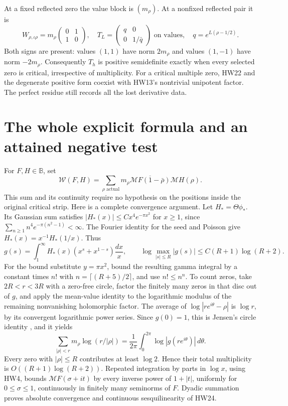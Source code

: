 \documentclass[11pt,a4paper]{article}
\theoremstyle{definition}\newtheorem{definition}[theorem]{Definition}
\newcommand{\B}{\mathbb B}\newcommand{\N}{\mathbb N}
\providecommand{\M}{\mathcal M}
\begin{document}
At a fixed reflected zero the value block is \((m_\rho)\).
At a nonfixed reflected pair it is
\[
 W_{\rho,\iota\rho}
   =m_\rho\begin{pmatrix}0&1\\1&0\end{pmatrix},
 \quad
 T_L=\begin{pmatrix}q&0\\0&1/\bar q\end{pmatrix}
       \text{ on values},\quad q=e^{L(\rho-1/2)}.
 \tag{HW23}\label{hw:hyperbolic}
\]
Both signs are present: values \((1,1)\) have norm \(2m_\rho\)
and values \((1,-1)\) have norm \(-2m_\rho\).
Consequently \(T_h\) is positive semidefinite exactly when
every selected zero is critical, irrespective of multiplicity.
For a critical multiple zero, HW22 and the degenerate positive
form coexist with HW13's nontrivial unipotent factor.
The perfect residue still records all the lost derivative data.

\section{The whole explicit formula and an attained negative test}

For \(F,H\in\B\), set
\[
 \mathcal W(F,H)=\sum_{\rho\text{ actual}}
       m_\rho\overline{\M F(1-\bar\rho)}\M H(\rho).
 \tag{HW24}\label{hw:globalweil}
\]
This sum and its continuity require no hypothesis on the positions
inside the original critical strip. Here is a complete convergence
argument. Let \(H_*=\Theta\phi_*\). Its Gaussian sum satisfies
\(|H_*(x)|\le Cx^4e^{-\pi x^2}\) for \(x\ge1\), since
\(\sum_{n\ge1}n^4e^{-\pi(n^2-1)}<\infty\).
The Fourier identity for the seed and Poisson give
\(H_*(x)=x^{-1}H_*(1/x)\). Thus
\[
 g(s)=\int_1^\infty H_*(x)(x^s+x^{1-s})\frac{dx}{x},
 \qquad \log\max_{|s|\le R}|g(s)|
              \le C(R+1)\log(R+2).
 \tag{HW25}
\]
For the bound substitute \(y=\pi x^2\), bound the resulting
gamma integral by a constant times \(n!\) with
\(n=\lceil(R+5)/2\rceil\), and use \(n!\le n^n\).
To count zeros, take \(2R<r<3R\) with a zero-free circle,
factor the finitely many zeros in that disc out of \(g\), and
apply the mean-value identity to the logarithmic modulus of the
remaining nonvanishing holomorphic factor. The average of
\(\log|re^{i\theta}-\rho|\) is \(\log r\), by its convergent
logarithmic power series. Since \(g(0)=1\), this is Jensen's
circle identity \cite{HW-Jensen}, and it yields
\[
 \sum_{|\rho|<r}m_\rho\log(r/|\rho|)
  =\frac1{2\pi}\int_0^{2\pi}\log|g(re^{i\theta})|\,d\theta .
 \tag{HW26}
\]
Every zero with \(|\rho|\le R\) contributes at least \(\log2\).
Hence their total multiplicity is \(O((R+1)\log(R+2))\).
Repeated integration by parts in \(\log x\), using HW4,
bounds \(\M F(\sigma+it)\) by every inverse power of
\(1+|t|\), uniformly for \(0\le\sigma\le1\), continuously
in finitely many seminorms of \(F\).
Dyadic summation proves absolute convergence and continuous
sesquilinearity of HW24.
\end{document}

